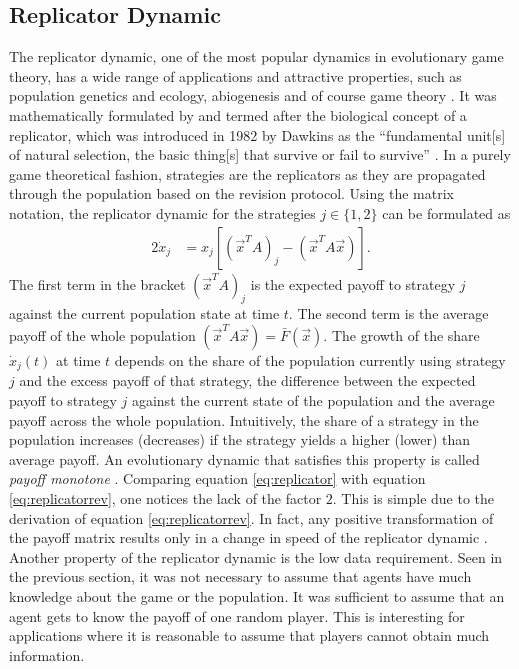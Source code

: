 \subsection{Replicator Dynamic}
\label{sec:replicatordynamic}
The replicator dynamic, one of the most popular dynamics in 
evolutionary game theory, has a wide range of applications and 
attractive properties, such as population genetics and ecology, abiogenesis and
of course game theory \parencite[203]{hofbauer_evolutionary_1998}. 
It was mathematically formulated by \textcite{taylor_evolutionary_1978} and 
termed after the biological concept of a replicator, which was 
introduced in 1982 by Dawkins as the ``fundamental unit[s] of natural selection,
the basic thing[s] that survive or fail to survive''
\parencite[254]{dawkins_selfish_2016}. In a purely game theoretical fashion,
strategies are the replicators as they are propagated through the population
based on the revision protocol. Using the matrix notation, 
the replicator dynamic  
for the strategies $j \in \{1,2\}$ can be formulated as 
\begin{alignat}{2}
        \dot{x}_j &= x_j\left[\left(\vec{x}^T A\right)_j -
        \left(\vec{x}^T A \vec{x}\right)\right]. 
        \label{eq:replicator}
\end{alignat}
The first term in the bracket $(\vec{x}^T A)_j$ is the expected payoff to 
strategy $j$ against the current population state at time $t$. The second
term is the average payoff of the whole population 
$(\vec{x}^T A \vec{x}) =\bar{F}(\vec{x})$.
The growth of the share $\dot{x}_j(t)$ at time $t$ depends 
on the share of the population currently using strategy $j$ and the 
excess payoff of that strategy, the difference between the expected 
payoff to strategy $j$ against the current state of the population and the
average payoff across the whole population.
Intuitively, the share of a strategy in the population increases (decreases) 
if the strategy yields a higher (lower) than average payoff. 
An evolutionary dynamic that satisfies this property is called 
\textit{payoff monotone} \parencite[30]{szabo_evolutionary_2007}. 
Comparing equation \eqref{eq:replicator} with equation 
\eqref{eq:replicatorrev}, one notices the lack of the factor $2$. 
This is simple due to the derivation of equation \eqref{eq:replicatorrev}.
In fact, any positive transformation of the payoff matrix 
results only in a change in speed of the replicator dynamic
\parencite[73]{weibull_evolutionary_1997}.
Another property of the replicator dynamic is the low data requirement.
Seen in the previous section, it was not 
necessary to assume that agents have much knowledge about the game or
the population. It was sufficient to assume that an agent gets to know the 
payoff of one random player. This is interesting for applications where it
is reasonable to assume that players cannot obtain much information.

